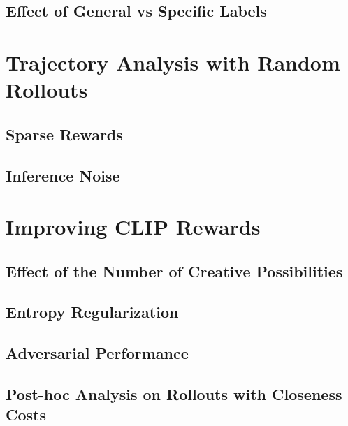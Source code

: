 \subsection{Effect of General vs Specific Labels}
\label{sec:clip-labels}


\section{Trajectory Analysis with Random Rollouts}
\label{sec:random-rollouts}


\subsection{Sparse Rewards} %
\label{sec:sparse-rewards}


\subsection{Inference Noise} %
\label{sec:inference-noise}



\section{Improving CLIP Rewards}
\label{sec:improving-rewards}

\subsection{Effect of the Number of Creative Possibilities}
\label{sec:clip-categories}

\subsection{Entropy Regularization}
\label{sec:entropy-regularization}


\subsection{Adversarial Performance}
\label{sec:adversarial-performance}


\subsection{Post-hoc Analysis on Rollouts with Closeness Costs}
\label{sec:closeness-rollouts}

